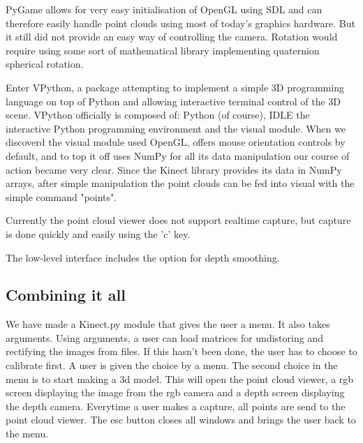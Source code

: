 PyGame allows for very easy initialisation of OpenGL using SDL and can therefore
easily handle point clouds using most of today's graphics hardware. But it still
did not provide an easy way of controlling the camera. Rotation would require
using some sort of mathematical library implementing quaternion spherical rotation.

Enter VPython, a package attempting to implement a simple 3D programming
language on top of Python and allowing interactive terminal control of the
3D scene. VPython officially is composed of: Python (of course), IDLE the
interactive Python programming environment and the visual module. When we
discoverd the visual module used OpenGL, offers mouse orientation
controls by default, and to top it off uses NumPy for all its data manipulation
our course of action became very clear. Since the Kinect library provides its
data in NumPy arrays, after simple manipulation the point clouds can be fed into
visual with the simple command "points".

Currently the point cloud viewer does not support realtime capture, but capture
is done quickly and easily using the 'c' key.


The low-level interface includes the option for depth smoothing.

\subsection{Combining it all}
We have made a Kinect.py module that gives the user a menu. It also takes
arguments. Using arguments, a user can load matrices for undistoring and
rectifying the images from files. If this hasn't been done, the user has to
choose to calibrate first. A user is given the choice by a menu. The second
choice in the menu is to start making a 3d model. This will open the point 
cloud viewer, a rgb screen displaying the image from the rgb camera and a 
depth screen displaying the depth camera. Everytime a user makes a capture,
all points are send to the point cloud viewer. The esc button closes all windows
and brings the user back to the menu.

